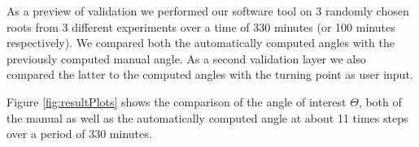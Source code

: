 As a preview of validation we performed our software tool on 3 randomly chosen roots from 3 different experiments over a time of 330 minutes (or 100 minutes respectively). We compared both the automatically computed angles with the previously computed manual angle. As a second validation layer we also compared the latter to the computed angles with the turning point as user input.

Figure \ref{fig:resultPlots} shows the comparison of the angle of interest \( \Theta \), both of the manual as well as the automatically computed angle at about 11 times steps over a period of 330 minutes.





